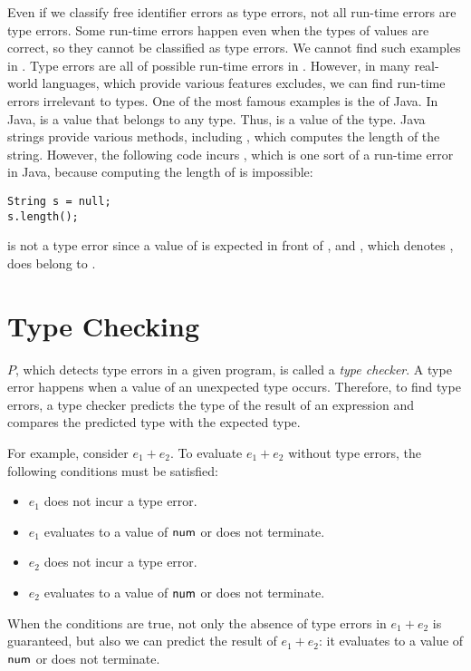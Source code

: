Even if we classify free identifier errors as type errors, not all run-time
errors are type errors. Some run-time errors happen even when the types of
values are correct, so they cannot be classified as type errors. We cannot find
such examples in \plang. Type errors are all of possible run-time errors in
\plang. However, in many real-world languages, which provide various features
\plang excludes, we can find run-time errors irrelevant to types. One of the
most famous examples is the  of Java. In Java,
 is a value that belongs to any type. Thus,  is a value of the 
type. Java strings provide various methods, including , which
computes the length of the string. However, the following code incurs
, which is one sort of a run-time error in Java,
because computing the length of  is impossible:

\begin{verbatim}
String s = null;
s.length();
\end{verbatim}

 is not a type error since a value of  is
expected in front of , and , which denotes ,
does belong to .

\section{Type Checking}

$P$, which detects type errors in a given program, is called a \textit{type
checker}. A type error happens when a value of an unexpected
type occurs. Therefore, to find type errors, a type checker predicts the type
of the result of an expression and compares the predicted type with the expected
type.

For example, consider $e_1+e_2$. To evaluate $e_1+e_2$
without type errors, the following conditions must be satisfied:
\begin{itemize}
  \item $e_1$ does not incur a type error.
  \item $e_1$ evaluates to a value of $\textsf{num}$ or does not terminate.
  \item $e_2$ does not incur a type error.
  \item $e_2$ evaluates to a value of $\textsf{num}$ or does not terminate.
\end{itemize}
When the conditions are true, not only the absence of type errors in $e_1+e_2$
is guaranteed, but also we can predict the result of $e_1+e_2$:
it evaluates to a value of $\textsf{num}$ or does not terminate.


